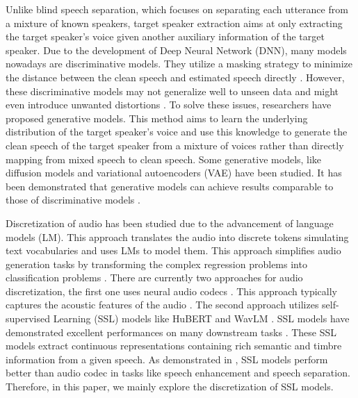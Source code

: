 \documentclass[conference]{IEEEtran}
\begin{document}
Unlike blind speech separation, which focuses on separating each utterance from a mixture 
of known speakers, target speaker extraction aims at only extracting the 
target speaker's voice given another auxiliary information of the target speaker. Due to the 
development of Deep Neural Network (DNN), many models nowadays are discriminative models. They 
utilize a masking strategy to minimize the distance between the clean speech and estimated 
speech directly \cite{luo2019conv,spex_plus,sepformer,sef_net}. However, these discriminative 
models may not generalize well to unseen data and might even introduce unwanted distortions \cite{distortion}. To solve these issues, researchers have proposed generative models. This method aims to learn the underlying distribution of the target speaker's voice and use this knowledge to generate the clean speech of the target speaker from a mixture of voices rather 
than directly mapping from mixed speech to clean speech. Some generative models, like diffusion
models \cite{target_diff} and variational autoencoders (VAE) \cite{vae} have been studied. It has been demonstrated that generative models can achieve results comparable to those of discriminative models \cite{target_diff,tokensplit}.

Discretization of audio has been studied due to the advancement of language models (LM). 
This approach translates the audio into discrete tokens simulating text vocabularies and uses LMs to 
model them. This approach simplifies audio generation tasks by transforming the complex 
regression problems into classification problems \cite{dasb}. There are currently two approaches for
audio discretization, the first one uses neural audio codecs \cite{dac}. This approach 
typically captures the acoustic features of the audio \cite{speech_tokenizer}. The second approach 
utilizes  self-supervised Learning (SSL) models like HuBERT \cite{hubert} and WavLM \cite{wavlm}.
SSL models have demonstrated 
excellent performances on many downstream tasks \cite{superb}. These SSL models extract  
continuous representations containing rich semantic and timbre information from a given speech. 
As demonstrated in \cite{dasb}, SSL models perform better than audio codec in tasks like speech 
enhancement and speech separation. Therefore, in this 
paper, we mainly explore the discretization of SSL models.  
\end{document}
